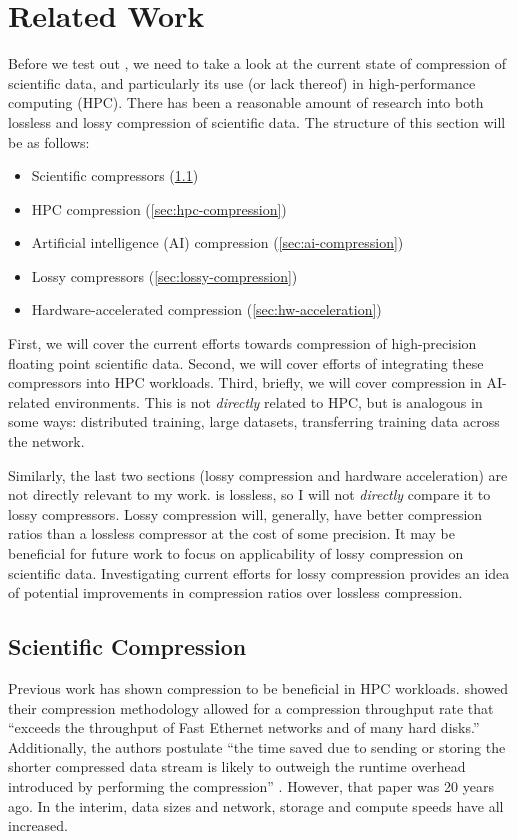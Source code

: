 \chapter{Related Work}
\label{sec:related-work}
Before we test out \openzl{}, we need to take a look at the current state of
compression of scientific data, and particularly its use (or lack thereof) in
high-performance computing (HPC). There has been a reasonable amount of research
into both lossless and lossy compression of scientific data. The structure of
this section will be as follows:
\begin{itemize}
\item Scientific compressors (\cref{sec:sci-compression})
\item HPC compression (\cref{sec:hpc-compression})
\item Artificial intelligence (AI) compression (\cref{sec:ai-compression})
\item Lossy compressors (\cref{sec:lossy-compression})
\item Hardware-accelerated compression (\cref{sec:hw-acceleration})
\end{itemize}

First, we will cover the current efforts towards compression of high-precision
floating point scientific data. Second, we will cover efforts of integrating
these compressors into HPC workloads. Third, briefly, we will cover compression
in AI-related environments. This is not \emph{directly} related to HPC, but is
analogous in some ways: distributed training, large datasets, transferring
training data across the network.

Similarly, the last two sections (lossy compression and hardware acceleration)
are not directly relevant to my work. \openzl{} is lossless, so I will not
\emph{directly} compare it to lossy compressors. Lossy compression will,
generally, have better compression ratios than a lossless compressor at the cost
of some precision\cite{lu_understanding_2018}. It may be beneficial for future
work to focus on applicability of lossy compression on scientific data.
Investigating current efforts for lossy compression provides an idea of
potential improvements in compression ratios over lossless compression.

\section{Scientific Compression}
\label{sec:sci-compression}
Previous work has shown compression to be beneficial in HPC workloads.
\cite{ratanaworabhan_fast_2006} showed their compression methodology allowed for
a compression throughput rate that ``exceeds the throughput of Fast Ethernet
networks and of many hard disks.'' Additionally, the authors postulate ``the
time saved due to sending or storing the shorter compressed data stream is
likely to outweigh the runtime overhead introduced by performing the
compression'' \cite{ratanaworabhan_fast_2006}. However, that paper was 20 years
ago. In the interim, data sizes and network, storage and compute speeds have all
increased.

